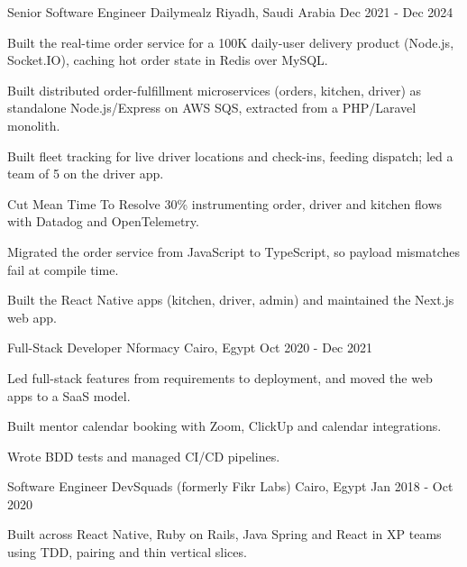 \begin{cventries}
  \cventry
    {Senior Software Engineer} %
    {Dailymealz} %
    {Riyadh, Saudi Arabia} %
    {Dec 2021 - Dec 2024} %
    {
      \begin{cvitems}
        \item {Built the real-time order service for a 100K daily-user delivery product (Node.js, Socket.IO), caching hot order state in Redis over MySQL.}
        \item {Built distributed order-fulfillment microservices (orders, kitchen, driver) as standalone Node.js/Express on AWS SQS, extracted from a PHP/Laravel monolith.}
        \item {Built fleet tracking for live driver locations and check-ins, feeding dispatch; led a team of 5 on the driver app.}
        \item {Cut Mean Time To Resolve 30\% instrumenting order, driver and kitchen flows with Datadog and OpenTelemetry.}
        \item {Migrated the order service from JavaScript to TypeScript, so payload mismatches fail at compile time.}
        \item {Built the React Native apps (kitchen, driver, admin) and maintained the Next.js web app.}
      \end{cvitems}
    }

  \cventry
    {Full-Stack Developer} %
    {Nformacy} %
    {Cairo, Egypt} %
    {Oct 2020 - Dec 2021} %
    {
      \begin{cvitems} %
        \item {Led full-stack features from requirements to deployment, and moved the web apps to a SaaS model.}
        \item {Built mentor calendar booking with Zoom, ClickUp and calendar integrations.}
        \item {Wrote BDD tests and managed CI/CD pipelines.}
      \end{cvitems}
    }

  \cventry
    {Software Engineer} %
    {DevSquads (formerly Fikr Labs)} %
    {Cairo, Egypt} %
    {Jan 2018 - Oct 2020} %
    {
      \begin{cvitems}
        \item {Built across React Native, Ruby on Rails, Java Spring and React in XP teams using TDD, pairing and thin vertical slices.}
      \end{cvitems}
    }

\end{cventries}

